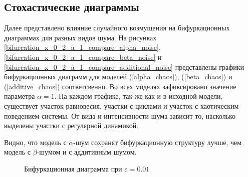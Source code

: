 \subsection{Стохастические диаграммы}

    Далее представлено влияние случайного возмущения на бифуркационных диаграммах для разных видов шума. На рисунках \ref{bifurcation_x_0_2_a_1_compare_alpha_noise}, \ref{bifurcation_x_0_2_a_1_compare_beta_noise} и \ref{bifurcation_x_0_2_a_1_compare_additional_noise} представлены графики бифуркационных диаграмм для моделей (\ref{alpha_chaos}), (\ref{beta_chaos}) и (\ref{additive_chaos}) соответсвенно. Во всех моделях зафиксировано значение параметра \(\alpha = 1\). На каждом графике, так же как и в исходной модели, существует участок равновесия, участки с циклами и участок с хаотическим поведением системы. От вида и интенсивности шума зависит то, насколько выделены участки с регулярной динамикой.

    Видно, что модель с \(\alpha\)-шум сохранят бифуркационную структуру лучше, чем модель с \(\beta\)-шумом и с аддитивным шумом.

    \begin{figure}
        \centering
        
            
        \captionsetup{justification=centering}
        \caption{Бифуркационная диаграмма при \(\varepsilon = 0.01\)}
    \end{figure}

        
